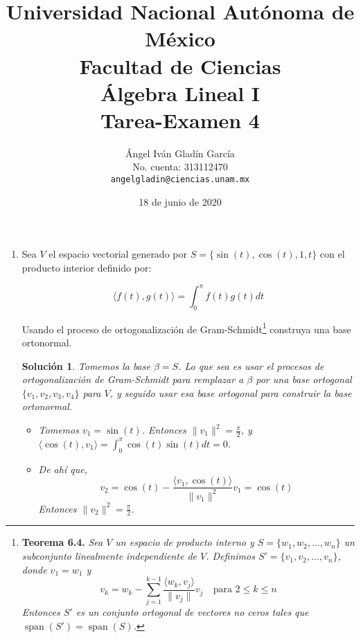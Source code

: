 \documentclass[letterpaper]{article}
\DeclareMathOperator{\Span}{span}
\newtheorem*{sol}{Solución}
\begin{document}
\title{
        Universidad Nacional Autónoma de México\\
        Facultad de Ciencias\\
        Álgebra Lineal I\\
    \vspace{.5cm}
    \large
        \textbf{Tarea-Examen 4}
}
\author{
    Ángel Iván Gladín García\\
    No. cuenta: 313112470\\
    \texttt{angelgladin@ciencias.unam.mx}
}
\date{18 de junio de 2020}
\maketitle

\begin{enumerate}

\item Sea $V$ el espacio vectorial generado por $S = \{\sin(t), \cos(t), 1, t \}$ con el producto interior
definido por:

\[
    \langle f(t), g(t) \rangle = \int_0^\pi f(t)g(t) dt
\]
    
Usando el proceso de ortogonalización de Gram-Schmidt\footnote{
    \textbf{Teorema 6.4.} \emph{Sea $V$ un espacio de producto interno y $S = \{ w_1,w_2,\ldots,w_n \}$ un subconjunto
    linealmente independiente de $V$. Definimos $S' = \{ v_1,v_2,\ldots,v_n \}$, donde $v_1 = w_1$ y
    \[
        v_k = w_k - \sum_{j=1}^{k-1} \frac{\langle w_k, v_j \rangle}{\| v_j \|} v_j \quad \text{para }
        2 \leq k \leq n
    \]
    Entonces $S'$ es un conjunto ortogonal de vectores no ceros tales que $\Span(S') = \Span(S)$.}
} construya una base ortonormal.

\begin{sol}
Tomemos la base $\beta = S$. Lo que sea es usar el procesos de ortogonalización de Gram-Schmidt para remplazar a
$\beta$ por una base ortogonal $\{ v_1, v_2, v_3, v_4 \}$ para $V$, y seguido usar esa base ortogonal para construir la
base ortonormal.

\begin{itemize}
    \item Tomemos $v_1 = \sin(t)$. Entonces $\| v_1 \|^2 = \frac{\pi}{2}$,
    y $\langle \cos(t), v_1 \rangle = \displaystyle\int_0^\pi \cos(t) \sin(t) dt = 0$.

    \item De ahí que,
    \[
        v_2 = \cos(t) - \frac{\langle v_1, \cos(t) \rangle}{\| v_1 \|^2}v_1 = \cos(t)
    \]
    Entonces $\| v_2 \|^2 = \frac{\pi}{2}$.


\end{itemize}
\end{sol}
\end{enumerate}
\end{document}
